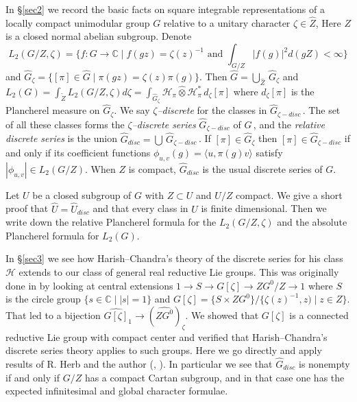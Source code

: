 \documentclass{conm-p-l}
\def\C{\mathbb{C}}
\def\cH{\mathcal{H}}
\begin{document}
In \S \ref{sec2} we record the basic facts on square integrable representations of
a locally compact unimodular group $G$ relative to a unitary character
$\zeta \in \widehat{Z}$,  Here $Z$ is a closed normal abelian subgroup.
Denote 
$$
L_2(G/Z,\zeta) = \{f:G \to \C \mid f(gz) = \zeta(z)^{-1} 
	\text{ and } \int_{G/Z} |f(g)|^2 d(gZ) < \infty\}
$$
and $\widehat{G}_\zeta = \{[\pi]\in\widehat{G} \mid \pi(gz)=\zeta(z)\pi(g)\}$.
Then $\widehat{G} = \bigcup_{\widehat{Z}}\, \widehat{G}_\zeta$ and 
$L_2(G) = \int_{\widetilde{Z}} L_2(G/Z,\zeta) d\zeta =
\int_{\widehat{G}_\zeta} \cH_\pi \widehat{\otimes} \cH_\pi^*\, d_\zeta[\pi]$
where $d_\zeta[\pi]$ is the Plancherel measure on $\widehat{G}_\zeta$.
We say {\em $\zeta$--discrete} for the classes in $\widehat{G}_{\zeta-disc}$\,.
The set of all these classes forms the {\em $\zeta$--discrete series}
$\widehat{G}_{\zeta-disc}$ of $G$\,, and the {\em relative discrete series} is 
the union $\widehat{G}_{disc} = \bigcup\, \widehat{G}_{\zeta-disc}$\,.  If
$[\pi] \in \widehat{G}_\zeta$ then $[\pi] \in \widehat{G}_{\zeta-disc}$ if
and only if its coefficient functions $\phi_{u,v}(g)=\langle u, \pi(g)v\rangle$
satisfy $|\phi_{u,v}| \in L_2(G/Z)$.  When $Z$ is compact, $\widehat{G}_{disc}$
is the usual discrete series of $G$.  

Let $U$ be a closed subgroup of $G$ with $Z \subset U$ and $U/Z$ compact.
We give a short proof that $\widehat{U} = \widehat{U}_{disc}$ and that every 
class in $\widehat{U}$ is finite dimensional.  Then we write down the relative 
Plancherel formula for the $L_2(G/Z,\zeta)$ and the absolute Plancherel
formula for $L_2(G)$.

In \S \ref{sec3} we see how Harish--Chandra's theory of the discrete 
series for his
class $\cH$ extends to our class of general real reductive Lie groups.  This
was originally done in \cite[\S 3]{W1973} by looking at central extensions
$1 \to S \to G[\zeta] \to ZG^0/Z \to 1$ where $S$ is the circle group
$\{s \in \C \mid |s| = 1\}$ and
$G[\zeta] = \{S \times ZG^0\}/\{\zeta(z)^{-1},z) \mid z \in Z\}$. 
That led to 
a bijection $\widehat{G[\zeta]}_1 \to (\widehat{ZG^0})_\zeta$.  We showed
that $G[\zeta]$ is a connected reductive Lie group with compact center
and verified that Harish--Chandra's discrete series theory applies to
such groups.  Here we go directly and apply results of R. Herb and
the author (\cite{HW1986a}, \cite{HW1986b}).  In particular we see that
$\widehat{G}_{disc}$ is nonempty if and only if $G/Z$ has a compact
Cartan subgroup, and in that case one has the expected infinitesimal and 
global character formulae.
\end{document}
